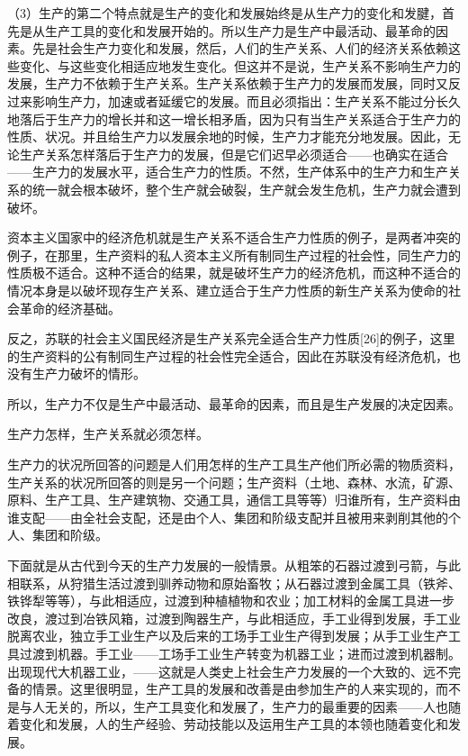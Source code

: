 （3）生产的第二个特点就是生产的变化和发展始终是从生产力的变化和发腱，首先是从生产工具的变化和发展开始的。所以生产力是生产中最活动、最革命的因素。先是社会生产力变化和发展，然后，人们的生产关系、人们的经济关系依赖这些变化、与这些变化相适应地发生变化。但这并不是说，生产关系不影响生产力的发展，生产力不依赖于生产关系。生产关系依赖于生产力的发展而发展，同时又反过来影响生产力，加速或者延缓它的发展。而且必须指出：生产关系不能过分长久地落后于生产力的增长并和这一增长相矛盾，因为只有当生产关系适合于生产力的性质、状况。并且给生产力以发展余地的时候，生产力才能充分地发展。因此，无论生产关系怎样落后于生产力的发展，但是它们迟早必须适合——也确实在适合——生产力的发展水平，适合生产力的性质。不然，生产体系中的生产力和生产关系的统一就会根本破坏，整个生产就会破裂，生产就会发生危机，生产力就会遭到破坏。

资本主义国家中的经济危机就是生产关系不适合生产力性质的例子，是两者冲突的例子，在那里，生产资料的私人资本主义所有制同生产过程的社会性，同生产力的性质极不适合。这种不适合的结果，就是破坏生产力的经济危机，而这种不适合的情况本身是以破坏现存生产关系、建立适合于生产力性质的新生产关系为使命的社会革命的经济基础。

反之，苏联的社会主义国民经济是生产关系完全适合生产力性质[26]的例子，这里的生产资料的公有制同生产过程的社会性完全适合，因此在苏联没有经济危机，也没有生产力破坏的情形。

所以，生产力不仅是生产中最活动、最革命的因素，而且是生产发展的决定因素。

生产力怎样，生产关系就必须怎样。

生产力的状况所回答的问题是人们用怎样的生产工具生产他们所必需的物质资料，生产关系的状况所回答的则是另一个问题；生产资料（土地、森林、水流，矿源、原料、生产工具、生产建筑物、交通工具，通信工具等等）归谁所有，生产资料由谁支配——由全社会支配，还是由个人、集团和阶级支配并且被用来剥削其他的个人、集团和阶级。

下面就是从古代到今天的生产力发展的一般情景。从粗笨的石器过渡到弓箭，与此相联系，从狩猎生活过渡到驯养动物和原始畜牧；从石器过渡到金属工具（铁斧、铁铧犁等等），与此相适应，过渡到种植植物和农业；加工材料的金属工具进一步改良，渡过到冶铁风箱，过渡到陶器生产，与此相适应，手工业得到发展，手工业脱离农业，独立手工业生产以及后来的工场手工业生产得到发展；从手工业生产工具过渡到机器。手工业——工场手工业生产转变为机器工业；进而过渡到机器制。出现现代大机器工业，——这就是人类史上社会生产力发展的一个大致的、远不完备的情景。这里很明显，生产工具的发展和改善是由参加生产的人来实现的，而不是与人无关的，所以，生产工具变化和发展了，生产力的最重要的因素——人也随着变化和发展，人的生产经验、劳动技能以及运用生产工具的本领也随着变化和发展。

